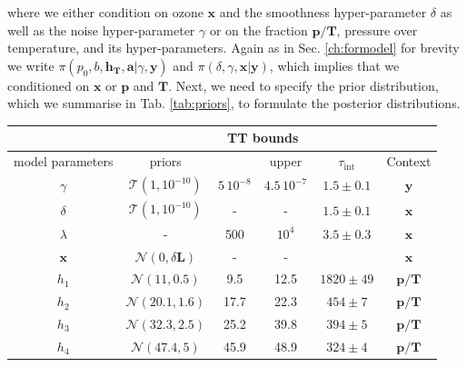 where we either condition on ozone $\bm{x}$ and the smoothness hyper-parameter $\delta$ as well as the noise hyper-parameter $\gamma$ or on the fraction $\bm{p}/\bm{T}$, pressure over temperature, and its hyper-parameters.
Again as in Sec. \ref{ch:formodel} for brevity we write $\pi(p_0,b,\bm{h_T},\bm{a}| \gamma,\bm{y}) $ and $\pi(\delta, \gamma, \bm{x}|\bm{y})$, which implies that we conditioned on $\bm{x}$ or $\bm{p}$ and $\bm{T}$. 
Next, we need to specify the prior distribution, which we summarise in Tab. \ref{tab:priors}, to formulate the posterior distributions.
\begin{table}
	\centering
	\begin{tabular}{ |c||c|c|c|c|c|   }
		\hline
		& &\multicolumn{2}{|c|}{TT bounds}& &\\
		\hline
		model parameters& priors&\makecell{lower}& \makecell{upper\\
		}&$\tau_{\text{int}}$&Context\\
		\hhline{|=||=|=|=|=|=|}
		$\gamma$ & $\mathcal{T}(1,10^{-10})$ &$5 \, 10^{-8}$ &$4.5 \, 10^{-7}$& $1.5 \pm 0.1$ &$\bm{y}$\\ \hline
		$\delta$ &$\mathcal{T}(1,10^{-10})$ & -&-& $1.5 \pm 0.1$ & $\bm{x}$\\ \hline
		$\lambda$ &- & 500&$10^4$& $3.5 \pm 0.3$ &$\bm{x}$\\ \hline
		$\bm{x}$ &$\mathcal{N}(0,\delta \bm{L})$ & -&-&& $\bm{x}$\\ \hhline{|=||=|=|=|=|=|}
		$h_{1}$ &  $\mathcal{N}(11,0.5)$&9.5 &12.5&$1820 \pm 49$ &$\bm{p/T}$\\ \hline
		$h_{2}$ &  $\mathcal{N}(20.1,1.6)$&17.7 &22.3&$454 \pm 7$&$\bm{p/T}$\\ \hline
		$h_{3}$ &  $\mathcal{N}(32.3,2.5)$&25.2&39.8&$394 \pm 5$&$\bm{p/T}$\\ \hline
		$h_{4}$ &  $\mathcal{N}(47.4,5)$&45.9 &48.9&$324 \pm 4$&$\bm{p/T}$\\ \hline

\end{tabular}
\end{table}
